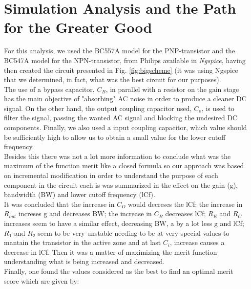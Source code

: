 \section{Simulation Analysis and the Path for the Greater Good}

For this analysis, we used the BC557A model for the PNP-transistor and the BC547A model for the NPN-transistor, from Philips available in \textit{Ngspice}, having then created the circuit presented in Fig. \ref{fig:bigscheme} (it was using Ngspice that we determined, in fact, what was the best circuit for our purposes). \\

The use of a bypass capacitor, $C_B$, in parallel with a resistor on the gain stage has the main objective of "absorbing" AC noise in order to produce a cleaner DC signal. On the other hand, the output coupling capacitor used, $C_o$, is used to filter the signal, passing the wanted AC signal and blocking the undesired DC components. Finally, we also used a input coupling capacitor, which value should be sufficiently high to allow us to obtain a small value for the lower cutoff frequency.\\

Besides this there was not a lot more information to conclude what was the maximum of the function merit like a closed formula so our approach was based on incremental modification in order to understand the purpose of each component in the circuit each is was summarized in the effect on the gain (g), bandwidth (BW) and lower cutoff frequency (lCf).\\

It was concluded that the increase in $C_O$  would decreses the lCf; the increase in $R_{out}$ increses g and decreases BW; the increase in $C_B$ decreases lCf; $R_E$ and $R_C$ increases seem to have a similar effect, decreasing BW, a by a lot less g and lCf; $R_1$ and $R_2$ seem to be very unstable needing to be at very special values to mantain the transistor in the active zone and at last $C_i$, increase causes a decrease in lCf. Then it was a matter of maximizing the merit function understanding what is being increased and decreased.\\

Finally, one found the values considered as the best to find an optimal merit score which are given by:


